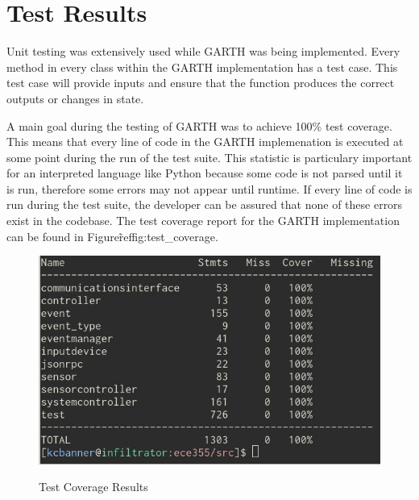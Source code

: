 \documentclass{article}
\begin{document}
\section{Test Results}

Unit testing was extensively used while GARTH was being
implemented. Every method in every class within the GARTH
implementation has a test case. This test case will provide inputs and
ensure that the function produces the correct outputs or changes in
state. 

A main goal during the testing of GARTH was to achieve 100\% test
coverage. This means that every line of code in the GARTH
implemenation is executed at some point during the run of the test
suite. This statistic is particulary important for an interpreted
language like Python because some code is not parsed until it is run,
therefore some errors may not appear until runtime. If every line of
code is run during the test suite, the developer can be assured that
none of these errors exist in the codebase. The test coverage report
for the GARTH implementation can be found in Figure\~ref{fig:test\_coverage}.

\begin{figure}[hp]
    \centering
        \caption{Test Coverage Results}
        \scriptsize
        \setlength{\unitlength}{2.0em}
        \includegraphics[scale=0.5]{test_coverage.png}
        \normalsize
    \label{fig:test_coverage}
\end{figure}
\end{document}
